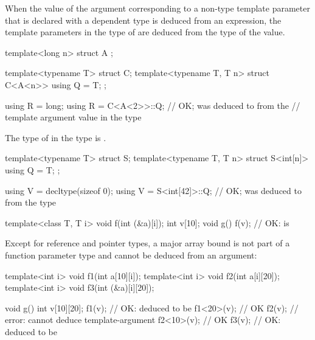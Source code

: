 \pnum
When the value of the argument
corresponding to a non-type template parameter 
that is declared with a dependent type
is deduced from an expression,
the template parameters in the type of 
are deduced from the type of the value.
\begin{example}
\begin{codeblock}
template<long n> struct A { };

template<typename T> struct C;
template<typename T, T n> struct C<A<n>> {
  using Q = T;
};

using R = long;
using R = C<A<2>>::Q;    // OK;  was deduced to  from the
                         // template argument value in the type 
\end{codeblock}
\end{example}
The type of  in the type  is .
\begin{example}
\begin{codeblock}
template<typename T> struct S;
template<typename T, T n> struct S<int[n]> {
  using Q = T;
};

using V = decltype(sizeof 0);
using V = S<int[42]>::Q; // OK;  was deduced to  from the type 
\end{codeblock}
\end{example}

\pnum
\begin{example}
\begin{codeblock}
template<class T, T i> void f(int (&a)[i]);
int v[10];
void g() {
  f(v);                  // OK:  is 
}
\end{codeblock}
\end{example}

\pnum
\begin{note}
Except for reference and pointer types, a major array bound is not part of a
function parameter type and cannot be deduced from an argument:

\begin{codeblock}
template<int i> void f1(int a[10][i]);
template<int i> void f2(int a[i][20]);
template<int i> void f3(int (&a)[i][20]);

void g() {
  int v[10][20];
  f1(v);            // OK:  deduced to be 
  f1<20>(v);        // OK
  f2(v);            // error: cannot deduce template-argument 
  f2<10>(v);        // OK
  f3(v);            // OK:  deduced to be 
}
\end{codeblock}
\end{note}

